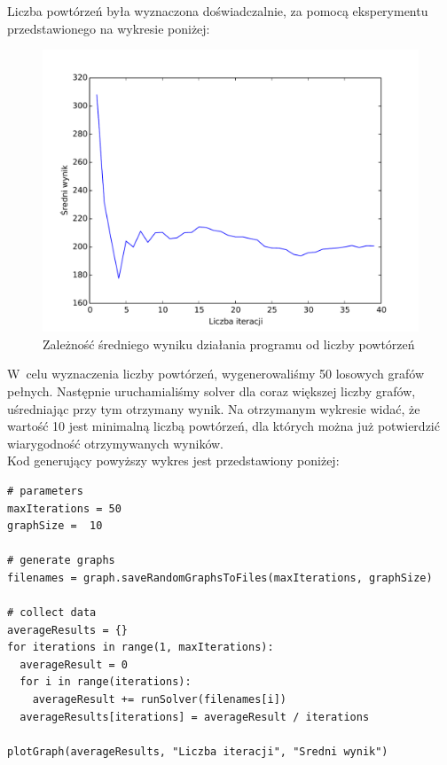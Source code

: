 \documentclass[11pt,a4paper]{article}
\begin{document}
Liczba powtórzeń była wyznaczona doświadczalnie, za pomocą eksperymentu przedstawionego na wykresie poniżej:
\begin{figure}[H]
\includegraphics[trim = 0mm 0mm 0mm 12mm, clip, width=14cm]{graphs/repetitions.pdf}
\caption{Zależność średniego wyniku działania programu od liczby powtórzeń}
\end{figure}

W~celu wyznaczenia liczby powtórzeń, wygenerowaliśmy 50 losowych grafów pełnych. Następnie uruchamialiśmy solver dla coraz większej liczby grafów, uśredniając przy tym otrzymany wynik. Na otrzymanym wykresie widać, że wartość 10 jest minimalną liczbą powtórzeń, dla których można już potwierdzić wiarygodność otrzymywanych wyników.\\

\newpage
Kod generujący powyższy wykres jest przedstawiony poniżej:

\begin{lstlisting}[caption = Fragment kodu programu w języku Python generującego powyższy wykres]
# parameters
maxIterations = 50
graphSize =  10

# generate graphs
filenames = graph.saveRandomGraphsToFiles(maxIterations, graphSize)

# collect data
averageResults = {}
for iterations in range(1, maxIterations):
  averageResult = 0
  for i in range(iterations):
    averageResult += runSolver(filenames[i])
  averageResults[iterations] = averageResult / iterations

plotGraph(averageResults, "Liczba iteracji", "Sredni wynik")
\end{lstlisting}
\end{document}
